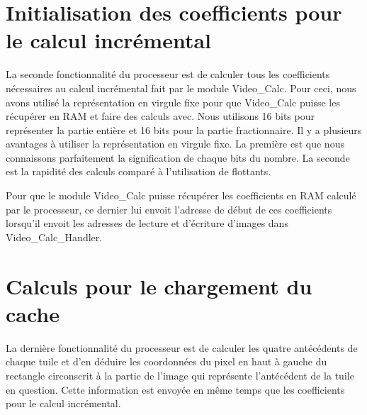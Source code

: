 \documentclass[a4paper,12pt]{report}
\begin{document}
{{			                                       \section{Initialisation des coefficients pour le calcul incrémental}
                                                               {La seconde fonctionnalité du processeur est de calculer tous les coefficients nécessaires au calcul incrémental fait par le module Video\_Calc. Pour ceci, nous avons utilisé la représentation en virgule fixe pour que Video\_Calc puisse les récupérer en RAM et faire des calculs avec. Nous utilisons 16 bits pour représenter la partie entière et 16 bits pour la partie fractionnaire. Il y a plusieurs avantages à utiliser la représentation en virgule fixe. La première est que nous connaissons parfaitement la signification de chaque bits du nombre. La seconde est la rapidité des calculs comparé à l'utilisation de flottants.


                                                                 Pour que le module Video\_Calc puisse récupérer les coefficients en RAM calculé par le processeur, ce dernier lui envoit l'adresse de début de ces coefficients lorsqu'il envoit les adresses de lecture et d'écriture d'images dans Video\_Calc\_Handler.
                                                               }

			                                       \section{Calculs pour le chargement du cache}
                                                                               {La dernière fonctionnalité du processeur est de calculer les quatre antécédents de chaque tuile et d'en déduire les coordonnées du pixel en haut à gauche du rectangle circonscrit à la partie de l'image qui représente l'antécédent de la tuile en question.
                                                                                 Cette information est envoyée en même temps que les coefficients pour le calcul incrémental.

}}}
\end{document}
